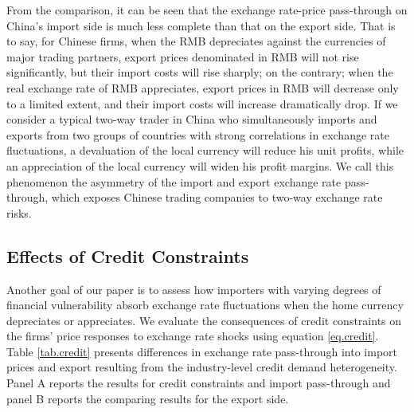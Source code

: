 \documentclass[12pt]{article}
\begin{document}
From the comparison, it can be seen that the exchange rate-price pass-through on China's import side is much less complete than that on the export side. That is to say, for Chinese firms, when the RMB depreciates against the currencies of major trading partners, export prices denominated in RMB will not rise significantly, but their import costs will rise sharply; on the contrary; when the real exchange rate of RMB appreciates, export prices in RMB will decrease only to a limited extent, and their import costs will increase dramatically drop. If we consider a typical two-way trader in China who simultaneously imports and exports from two groups of countries with strong correlations in exchange rate fluctuations, a devaluation of the local currency will reduce his unit profits, while an appreciation of the local currency will widen his profit margins. We call this phenomenon the asymmetry of the import and export exchange rate pass-through, which exposes Chinese trading companies to two-way exchange rate risks.

\subsection{Effects of Credit Constraints} \label{Results-Credit}

Another goal of our paper is to assess how importers with varying degrees of financial vulnerability absorb exchange rate fluctuations when the home currency depreciates or appreciates. We evaluate the consequences of credit constraints on the firms' price responses to exchange rate shocks using equation \ref{eq.credit}. Table \ref{tab.credit} presents differences in exchange rate pass-through into import prices and export resulting from the industry-level credit demand heterogeneity. Panel A reports the results for credit constraints and import pass-through and panel B reports the comparing results for the export side. 
\end{document}
